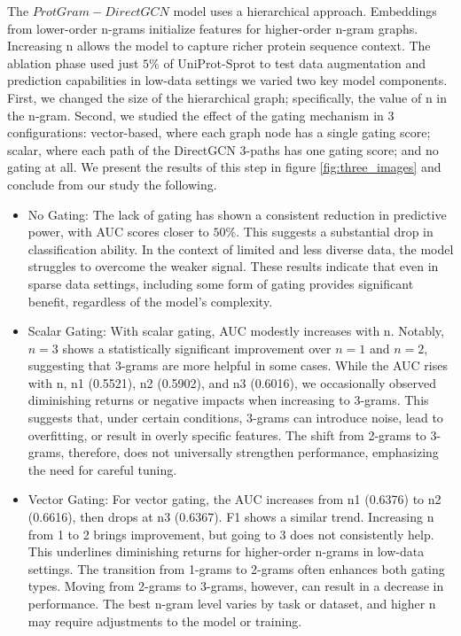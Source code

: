 \documentclass[utf8]{article}
\begin{document}
	The $ProtGram-DirectGCN$ model uses a hierarchical approach. Embeddings from lower-order n-grams initialize features for higher-order n-gram graphs. Increasing n allows the model to capture richer protein sequence context. The ablation phase used just $5\%$ of UniProt-Sprot to test data augmentation and prediction capabilities in low-data settings we varied two key model components. First, we changed the size of the hierarchical graph; specifically, the value of n in the n-gram. Second, we studied the effect of the gating mechanism in 3 configurations: vector-based, where each graph node has a single gating score; scalar, where each path of the DirectGCN 3-paths has one gating score; and no gating at all. We present the results of this step in figure \ref{fig:three_images} and conclude from our study the following.
	
	\begin{itemize}
		\item{No Gating}: The lack of gating has shown a consistent reduction in predictive power, with AUC scores closer to $50\%$. This suggests a substantial drop in classification ability. In the context of limited and less diverse data, the model struggles to overcome the weaker signal. These results indicate that even in sparse data settings, including some form of gating provides significant benefit, regardless of the model's complexity. 
		
		\item{Scalar Gating}: With scalar gating, AUC modestly increases with n. Notably, $n=3$ shows a statistically significant improvement over $n=1$ and $n=2$, suggesting that 3-grams are more helpful in some cases. While the AUC rises with n, n1 (0.5521), n2 (0.5902), and n3 (0.6016), we occasionally observed diminishing returns or negative impacts when increasing to 3-grams. This suggests that, under certain conditions, 3-grams can introduce noise, lead to overfitting, or result in overly specific features. The shift from 2-grams to 3-grams, therefore, does not universally strengthen performance, emphasizing the need for careful tuning.
		
		\item{Vector Gating}: For vector gating, the AUC increases from n1 (0.6376) to n2 (0.6616), then drops at n3 (0.6367). F1 shows a similar trend. Increasing n from 1 to 2 brings improvement, but going to 3 does not consistently help. This underlines diminishing returns for higher-order n-grams in low-data settings. The transition from 1-grams to 2-grams often enhances both gating types. Moving from 2-grams to 3-grams, however, can result in a decrease in performance. The best n-gram level varies by task or dataset, and higher n may require adjustments to the model or training.
	\end{itemize}
	
\end{document}
